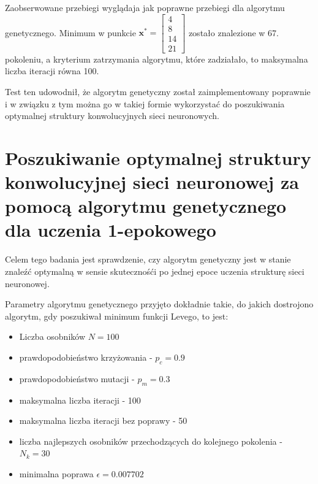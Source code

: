 Zaobserwowane przebiegi wyglądaja jak poprawne przebiegi dla algorytmu genetycznego.
Minimum w punkcie $\mathbf{x^*} = \begin{bmatrix}4 \\ 8 \\ 14 \\ 21\end{bmatrix}$ zostało znalezione w 67. pokoleniu, a kryterium zatrzymania algorytmu, które zadziałało, to maksymalna liczba iteracji równa 100.

Test ten udowodnił, że algorytm genetyczny został zaimplementowany poprawnie i w związku z tym można go w takiej formie wykorzystać do poszukiwania optymalnej struktury konwolucyjnych sieci neuronowych.

\section{Poszukiwanie optymalnej struktury konwolucyjnej sieci neuronowej za pomocą algorytmu genetycznego dla uczenia 1-epokowego}\label{sec:actual_experiment}
Celem tego badania jest sprawdzenie, czy algorytm genetyczny jest w stanie znaleźć optymalną w sensie skutecznośći po jednej epoce uczenia strukturę sieci neuronowej.

Parametry algorytmu genetycznego przyjęto dokładnie takie, do jakich dostrojono algorytm, gdy poszukiwał minimum funkcji Levego, to jest:
\begin{itemize}
  \item Liczba osobników $N = 100$
  \item prawdopodobieństwo krzyżowania - $p_{c} = 0.9$
  \item prawdopodobieństwo mutacji - $p_{m} = 0.3$
  \item maksymalna liczba iteracji - 100
  \item maksymalna liczba iteracji bez poprawy - 50
  \item liczba najlepszych osobników przechodzących do kolejnego pokolenia - $ N_{k} = 30$
  \item minimalna poprawa $\epsilon = 0.007702$
\end{itemize}

